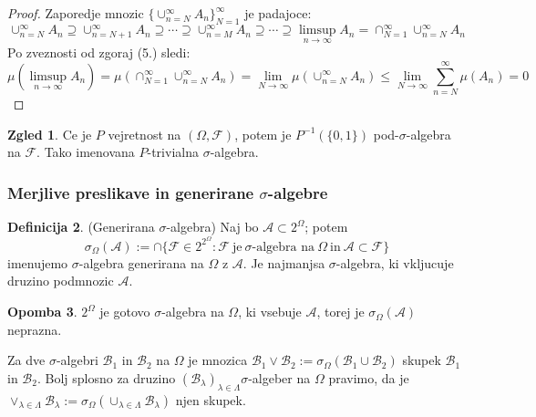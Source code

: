 \documentclass[a4paper,12pt]{article}
\theoremstyle{definition} %
\newtheorem{definicija}{Definicija}[section]
\newtheorem{zgled}[definicija]{Zgled}
\newtheorem{opomba}[definicija]{Opomba}
\theoremstyle{plain} %
\newcommand{\F}{\mathcal{F}}
\newcommand{\A}{\mathcal{A}}
\begin{document}
            \begin{proof}
                Zaporedje mnozic $\{\cup_{n=N}^\infty A_n\}_{N=1}^\infty$ je padajoce:
                $$
                \cup_{n=N}^\infty A_n \supseteq \cup_{n=N+1}^\infty A_n \supseteq \cdots \supseteq \cup_{n=M}^\infty A_n \supseteq \cdots \supseteq \limsup_{n \rightarrow \infty}A_n = \cap_{N=1}^\infty \cup_{n=N}^\infty A_n
                $$
                Po zveznosti od zgoraj (5.) sledi:
                $$
                \mu(\limsup_{n \rightarrow \infty}A_n) = \mu(\cap_{N=1}^\infty \cup_{n=N}^\infty A_n) = \lim_{N \rightarrow \infty}\mu(\cup_{n=N}^\infty A_n) \leq \lim_{N \rightarrow \infty}\sum_{n=N}^\infty \mu(A_n) = 0
                $$
            \end{proof}

            \begin{zgled}
                Ce je $P$ vejretnost na $\left( \Omega, \F \right)$, potem je $P^{-1}(\{0, 1\})$ pod-$\sigma$-algebra na $\F$. Tako imenovana $P$-trivialna $\sigma$-algebra.
            \end{zgled}

        \subsubsection{Merjlive preslikave in generirane $\sigma$-algebre}
            
            \begin{definicija}(Generirana $\sigma$-algebra)
                Naj bo $\A \subset 2^\Omega$; potem $$\sigma_\Omega(\A):=\cap\{\F \in 2^{2^\Omega}: \F \ \text{je} \ \sigma\text{-algebra na} \ \Omega \ \text{in} \ \A \subset \F \}$$ imenujemo $\sigma$-algebra generirana na $\Omega$ z $\A$. Je najmanjsa $\sigma$-algebra, ki vkljucuje druzino podmnozic $\A$.
            \end{definicija}

            \begin{opomba}
                $2^\Omega$ je gotovo $\sigma$-algebra na $\Omega$, ki vsebuje $\A$, torej je $\sigma_\Omega(\A)$ neprazna.
            \end{opomba}

            Za dve $\sigma$-algebri $\mathcal{B}_1$ in $\mathcal{B}_2$ na $\Omega$ je mnozica $\mathcal{B}_1 \vee \mathcal{B}_2 := \sigma_\Omega\left(\mathcal{B}_1 \cup \mathcal{B}_2\right)$ skupek $\mathcal{B}_1$ in $\mathcal{B}_2$. Bolj splosno
            za druzino $\left(\mathcal{B}_\lambda\right)_{\lambda \in \Lambda} \sigma$-algeber na $\Omega$ pravimo, da je $\vee_{\lambda \in \Lambda}\mathcal{B}_\lambda := \sigma_\Omega\left(\cup_{\lambda \in \Lambda}\mathcal{B}_\lambda\right)$ njen skupek.
\end{document}
